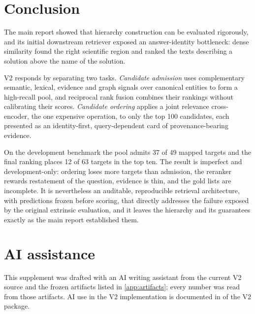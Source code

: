 \documentclass[11pt,a4paper]{article}
\newcommand{\cref}[1]{\autoref{#1}}
\theoremstyle{remark}
\begin{document}
\section{Conclusion}
\label{sec:conclusion}

The main report showed that hierarchy construction can be evaluated rigorously, and its
initial downstream retriever exposed an answer-identity bottleneck: dense similarity found
the right scientific region and ranked the texts describing a solution above the name of
the solution.

V2 responds by separating two tasks. \emph{Candidate admission} uses complementary
semantic, lexical, evidence and graph signals over canonical entities to form a
high-recall pool, and reciprocal rank fusion combines their rankings without calibrating
their scores. \emph{Candidate ordering} applies a joint relevance cross-encoder, the one
expensive operation, to only the top 100 candidates, each presented as an identity-first,
query-dependent card of provenance-bearing evidence.

On the development benchmark the pool admits 37 of 49 mapped targets and the final ranking
places 12 of 63 targets in the top ten. The result is imperfect and development-only:
ordering loses more targets than admission, the reranker rewards restatement of the
question, evidence is thin, and the gold lists are incomplete. It is nevertheless an
auditable, reproducible retrieval architecture, with predictions frozen before scoring,
that directly addresses the failure exposed by the original extrinsic evaluation, and it
leaves the hierarchy and its guarantees exactly as the main report established them.

\section*{AI assistance}
This supplement was drafted with an AI writing assistant from the current V2 source and
the frozen artifacts listed in \cref{app:artifacts}; every number was read from those
artifacts. AI use in the V2 implementation is documented in  of the V2
package.
\end{document}
